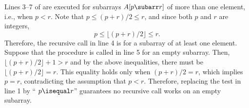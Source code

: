 Lines 3--7 of  are executed for subarrays $A[p\subarr r]$ of more than one element, i.e., when $p<r$.
Note that $p\le(p+r)/2\le r$, and since both $p$ and $r$ are integers,
\[
    p \le \lfloor(p+r)/2\rfloor \le r.
\]
Therefore, the recursive call in line 4 is for a subarray of at least one element.
Suppose that the procedure is called in line 5 for an empty subarray.
Then, $\lfloor(p+r)/2\rfloor+1>r$ and by the above inequalities, there must be $\lfloor(p+r)/2\rfloor=r$.
This equality holds only when $(p+r)/2=r$, which implies $p=r$, contradicting the assumption that $p<r$.
Therefore, replacing the test in line 1 by `` $p\isequal r$'' guarantees no recursive call works on an empty subarray.
